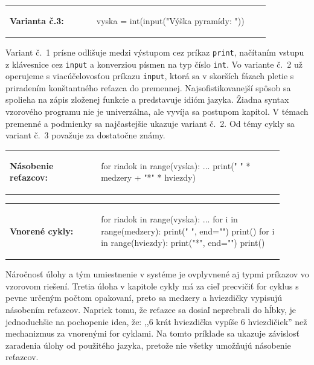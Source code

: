 \vspace{-2em}
\begin{tabular}{@{}p{0.3\linewidth}p{0.6\linewidth}}
\textbf{\small Varianta č.3:} &
\vspace{-1em}
\begin{solution}
vyska = int(input("Výška pyramídy: "))
\end{solution}
\end{tabular}

Variant č.~1 prísne odlišuje medzi výstupom cez príkaz \verb|print|, načítaním vstupu z klávesnice cez \verb|input| a konverziou písmen na typ číslo \verb|int|. Vo variante č.~2 už operujeme s viacúčelovosťou príkazu \verb|input|, ktorá sa v skorších fázach pletie s priradením konštantného reťazca do premennej. Najsofistikovanejší spôsob sa spolieha na zápis zloženej funkcie a predstavuje idióm jazyka. Žiadna syntax vzorového programu nie je univerzálna, ale vyvíja sa postupom kapitol. V témach premenné a podmienky sa najčastejšie ukazuje variant č.~2. Od témy cykly sa variant č.~3 považuje za dostatočne známy.

\begin{tabular}{@{}p{0.3\linewidth}p{0.6\linewidth}}
\textbf{\small Násobenie reťazcov:} &
\vspace{-1em}
\begin{solution}
for riadok in range(vyska):
	...
	print(" " * medzery + "*" * hviezdy)
\end{solution}
\end{tabular}

\vspace{-2em}
\begin{tabular}{@{}p{0.3\linewidth}p{0.6\linewidth}}
\textbf{\small Vnorené cykly:} &
\vspace{-1em}
\begin{solution}
for riadok in range(vyska):
	...
	for i in range(medzery):
		print(" ", end="")
	print()
	for i in range(hviezdy):
		print("*", end="")
	print()
\end{solution}
\end{tabular}

Náročnosť úlohy a tým umiestnenie v systéme je ovplyvnené aj typmi príkazov vo vzorovom riešení. Tretia úloha v kapitole cykly má za cieľ precvičiť for cyklus s pevne určeným počtom opakovaní, preto sa medzery a hviezdičky vypisujú násobením reťazcov. Napriek tomu, že reťazce sa dosiaľ neprebrali do hĺbky, je jednoduchšie na pochopenie idea, že: ,,6 krát hviezdička vypíše 6 hviezdičiek'' než mechanizmus za vnorenými for cyklami. Na tomto príklade sa ukazuje závislosť zaradenia úlohy od použitého jazyka, pretože nie všetky umožňujú násobenie reťazcov.

